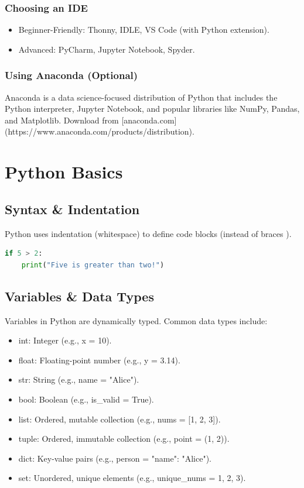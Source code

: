 \documentclass{article}
\begin{document}
\subsubsection{Choosing an IDE}

\begin{itemize}
    \item Beginner-Friendly: Thonny, IDLE, VS Code (with Python extension).
    \item Advanced: PyCharm, Jupyter Notebook, Spyder.
\end{itemize}

\subsubsection{Using Anaconda (Optional)}

Anaconda is a data science-focused distribution of Python that includes the Python interpreter, Jupyter Notebook, and popular libraries like NumPy, Pandas, and Matplotlib. Download from [anaconda.com](https://www.anaconda.com/products/distribution).

\section{Python Basics}

\subsection{Syntax \& Indentation}

Python uses indentation (whitespace) to define code blocks (instead of braces {}).

\begin{lstlisting}[language=Python]
if 5 > 2:
    print("Five is greater than two!")
\end{lstlisting}

\subsection{Variables \& Data Types}

Variables in Python are dynamically typed. Common data types include:

\begin{itemize}
    \item int: Integer (e.g., x = 10).
    \item float: Floating-point number (e.g., y = 3.14).
    \item str: String (e.g., name = "Alice").
    \item bool: Boolean (e.g., is_valid = True).
    \item list: Ordered, mutable collection (e.g., nums = [1, 2, 3]).
    \item tuple: Ordered, immutable collection (e.g., point = (1, 2)).
    \item dict: Key-value pairs (e.g., person = {"name": "Alice"}).
    \item set: Unordered, unique elements (e.g., unique_nums = {1, 2, 3}).
\end{itemize}
\end{document}
